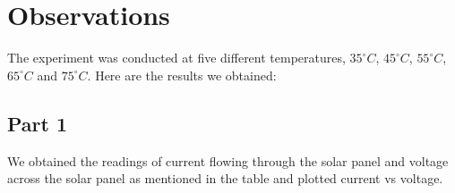 \documentclass[12pt]{article}
\begin{document}
\section{Observations}

The experiment was conducted at five different temperatures, \(35^{\circ}C\), \(45^{\circ}C\), \(55^{\circ}C\), \(65^{\circ}C\) and \(75^{\circ}C\). Here are the results we obtained:

\subsection{Part 1}

We obtained the readings of current flowing through the solar panel and voltage across the solar panel as mentioned in the table and plotted current vs voltage.
\end{document}

